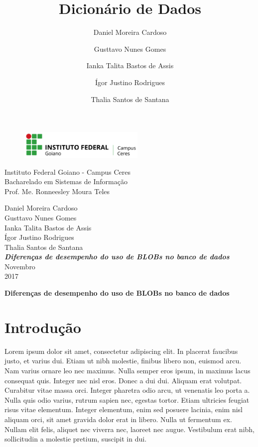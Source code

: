 \documentclass[12pt,a4paper]{article}
\title{Dicionário de Dados}
\author{Daniel Moreira Cardoso \and Gusttavo Nunes Gomes\and Ianka Talita Bastos de Assis\and Ígor Justino Rodrigues \and Thalia Santos de Santana}
\begin{document}
\begin{titlepage}
\begin{center}
\begin{figure}[htb]
                
                \label{figura:LogoIF}
        
                \centering
                \includegraphics[width=6cm]{recursos/imagens/logo.png} 
\end{figure}
Instituto Federal Goiano - Campus Ceres\\
Bacharelado em Sistemas de Informação\\
Prof. Me. Ronneesley Moura Teles\\\vspace{1cm}

Daniel Moreira Cardoso \\ 
Gusttavo Nunes Gomes \\ 
Ianka Talita Bastos de Assis \\ 
Ígor Justino Rodrigues \\ 
Thalia Santos de Santana\\
\vspace{6.0cm}
\textit{\textbf{\Large{Diferenças de desempenho do uso de BLOBs no banco de dados}}}\\\vspace{10cm}
Novembro\\
2017\\
\end{center}
\end{titlepage}
\tableofcontents
\newpage
\begin{center}
\textbf{\Large{Diferenças de desempenho do uso de BLOBs no banco de dados}}\\\vspace{0.5cm}
\end{center}
\section{Introdução}

Lorem ipsum dolor sit amet, consectetur adipiscing elit. In placerat faucibus justo, et varius dui. Etiam ut nibh molestie, finibus libero non, euismod arcu. Nam varius ornare leo nec maximus. Nulla semper eros ipsum, in maximus lacus consequat quis. Integer nec nisl eros. Donec a dui dui. Aliquam erat volutpat. Curabitur vitae massa orci. Integer pharetra odio arcu, ut venenatis leo porta a. Nulla quis odio varius, rutrum sapien nec, egestas tortor. Etiam ultricies feugiat risus vitae elementum. Integer elementum, enim sed posuere lacinia, enim nisl aliquam orci, sit amet gravida dolor erat in libero. Nulla ut fermentum ex. Nullam elit felis, aliquet nec viverra nec, laoreet nec augue. Vestibulum erat nibh, sollicitudin a molestie pretium, suscipit in dui.
\end{document}
